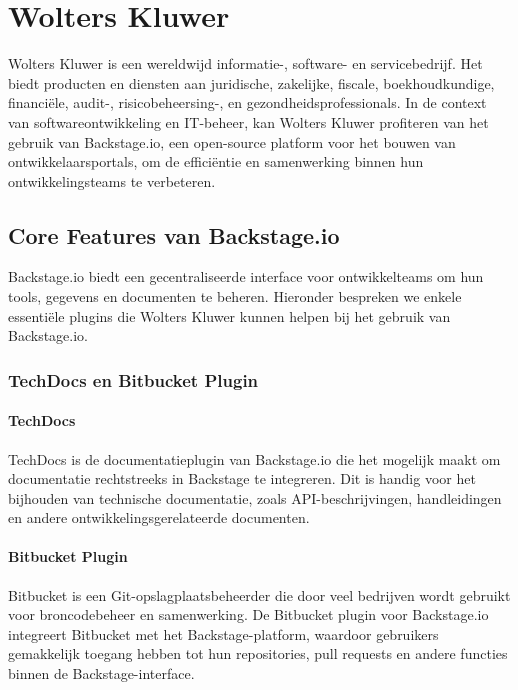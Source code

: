 \chapter{Wolters Kluwer}
\label{ch:Wolters Kluwer}

Wolters Kluwer is een wereldwijd informatie-, software- en servicebedrijf. Het biedt producten en diensten aan juridische, zakelijke, fiscale, boekhoudkundige, financiële, audit-, risicobeheersing-, en gezondheidsprofessionals. In de context van softwareontwikkeling en IT-beheer, kan Wolters Kluwer profiteren van het gebruik van Backstage.io, een open-source platform voor het bouwen van ontwikkelaarsportals, om de efficiëntie en samenwerking binnen hun ontwikkelingsteams te verbeteren. 

\section{Core Features van Backstage.io}

Backstage.io biedt een gecentraliseerde interface voor ontwikkelteams om hun tools, gegevens en documenten te beheren. Hieronder bespreken we enkele essentiële plugins die Wolters Kluwer kunnen helpen bij het gebruik van Backstage.io.

\subsection{TechDocs en Bitbucket Plugin}

\subsubsection{TechDocs}
TechDocs is de documentatieplugin van Backstage.io die het mogelijk maakt om documentatie rechtstreeks in Backstage te integreren. Dit is handig voor het bijhouden van technische documentatie, zoals API-beschrijvingen, handleidingen en andere ontwikkelingsgerelateerde documenten.

\subsubsection{Bitbucket Plugin}
Bitbucket is een Git-opslagplaatsbeheerder die door veel bedrijven wordt gebruikt voor broncodebeheer en samenwerking. De Bitbucket plugin voor Backstage.io integreert Bitbucket met het Backstage-platform, waardoor gebruikers gemakkelijk toegang hebben tot hun repositories, pull requests en andere functies binnen de Backstage-interface.

